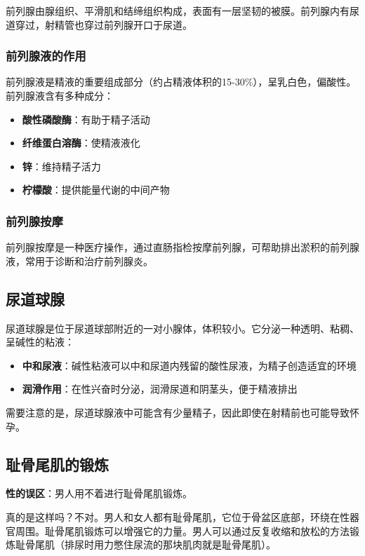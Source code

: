 前列腺由腺组织、平滑肌和结缔组织构成，表面有一层坚韧的被膜。前列腺内有尿道穿过，射精管也穿过前列腺开口于尿道。

\subsubsection{前列腺液的作用}

前列腺液是精液的重要组成部分（约占精液体积的15-30\%），呈乳白色，偏酸性。前列腺液含有多种成分：
\begin{itemize}
    \item \textbf{酸性磷酸酶}：有助于精子活动
    \item \textbf{纤维蛋白溶酶}：使精液液化
    \item \textbf{锌}：维持精子活力
    \item \textbf{柠檬酸}：提供能量代谢的中间产物
\end{itemize}

\subsubsection{前列腺按摩}

前列腺按摩是一种医疗操作，通过直肠指检按摩前列腺，可帮助排出淤积的前列腺液，常用于诊断和治疗前列腺炎。

\subsection{尿道球腺}

尿道球腺是位于尿道球部附近的一对小腺体，体积较小。它分泌一种透明、粘稠、呈碱性的粘液：
\begin{itemize}
    \item \textbf{中和尿液}：碱性粘液可以中和尿道内残留的酸性尿液，为精子创造适宜的环境
    \item \textbf{润滑作用}：在性兴奋时分泌，润滑尿道和阴茎头，便于精液排出
\end{itemize}

需要注意的是，尿道球腺液中可能含有少量精子，因此即使在射精前也可能导致怀孕。

\subsection{耻骨尾肌的锻炼}

\textbf{性的误区}：男人用不着进行耻骨尾肌锻炼。

真的是这样吗？不对。男人和女人都有耻骨尾肌，它位于骨盆区底部，环绕在性器官周围。耻骨尾肌锻炼可以增强它的力量。男人可以通过反复收缩和放松的方法锻炼耻骨尾肌（排尿时用力憋住尿流的那块肌肉就是耻骨尾肌）。

